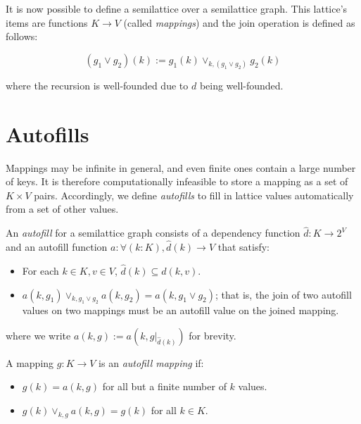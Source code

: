 \documentclass{article}
\begin{document}
        It is now possible to define a semilattice over a semilattice graph. This lattice's items are functions $K \rightarrow V$ (called \emph{mappings}) and the join operation is defined as follows:

        $$ (g_1 \vee g_2)(k) := g_1(k) \vee_{k, (g_1 \vee g_2)} g_2(k) $$

        where the recursion is well-founded due to $d$ being well-founded.

    \section{Autofills}

        Mappings may be infinite in general, and even finite ones contain a large number of keys. It is therefore computationally infeasible to store a mapping as a set of $K \times V$ pairs. Accordingly, we define \emph{autofills} to fill in lattice values automatically from a set of other values.




        An \emph{autofill} for a semilattice graph consists of a dependency function $\hat{d}: K \rightarrow 2^V$ and an autofill function $a : \forall (k:K), \hat{d}(k) \rightarrow V$ that satisfy:

        \begin{itemize}
          \item
            For each $k \in K, v \in V$, $\hat{d}(k) \subseteq d(k, v)$.
          \item
            $a(k, g_1) \vee_{k, g_1 \vee g_2} a(k, g_2) = a(k, g_1 \vee g_2)$; that is, the join of two autofill values on two mappings must be an autofill value on the joined mapping.
        \end{itemize}

        where we write $a(k, g) := a(k, g|_{\hat{d}(k)})$ for brevity.


        A mapping $g : K \rightarrow V$ is an \emph{autofill mapping} if:
        
        \begin{itemize}
          \item $g(k) = a(k, g)$ for all but a finite number of $k$ values.
          \item $g(k) \vee_{k, g} a(k, g) = g(k)$ for all $k \in K$.
        \end{itemize}
\end{document}
